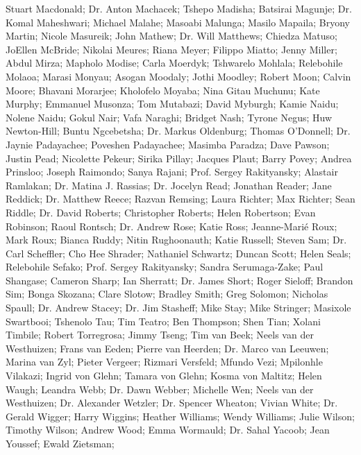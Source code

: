     Stuart Macdonald;
Dr. Anton Machacek;
    Tshepo Madisha;
    Batsirai Magunje;
Dr. Komal Maheshwari;
    Michael Malahe;
    Masoabi Malunga;
    Masilo Mapaila;
    Bryony Martin;
    Nicole Masureik;
    John Mathew;
Dr. Will Matthews;
    Chiedza Matuso;
    JoEllen McBride;
    Nikolai Meures;
    Riana Meyer;
    Filippo Miatto;
    Jenny Miller;
    Abdul Mirza;
    Mapholo Modise;
    Carla Moerdyk;
    Tshwarelo Mohlala;
    Relebohile Molaoa;
    Marasi Monyau;
    Asogan Moodaly;
    Jothi Moodley;
    Robert Moon;
    Calvin Moore;
    Bhavani Morarjee;
    Kholofelo Moyaba;
    Nina Gitau Muchunu;
    Kate Murphy;
    Emmanuel Musonza;
    Tom Mutabazi;
    David Myburgh;
    Kamie Naidu;
    Nolene Naidu;
    Gokul Nair;
    Vafa Naraghi;
    Bridget Nash;
    Tyrone Negus;
    Huw Newton-Hill;
    Buntu Ngcebetsha;
Dr. Markus Oldenburg;
    Thomas O’Donnell;
Dr. Jaynie Padayachee;
    Poveshen Padayachee;
    Masimba Paradza;
    Dave Pawson;
    Justin Pead;
    Nicolette Pekeur;
    Sirika Pillay;
    Jacques Plaut;
    Barry Povey;
    Andrea Prinsloo;
    Joseph Raimondo;
    Sanya Rajani;
Prof. Sergey Rakityansky;
    Alastair Ramlakan;
Dr. Matina J. Rassias;
Dr. Jocelyn Read;
    Jonathan Reader;
    Jane Reddick;
Dr. Matthew Reece;
    Razvan Remsing;
    Laura Richter;
    Max Richter;
    Sean Riddle;
Dr. David Roberts;
    Christopher Roberts;
    Helen Robertson;
    Evan Robinson;
    Raoul Rontsch;
Dr. Andrew Rose;
    Katie Ross;
    Jeanne-Marié Roux;
    Mark Roux;
    Bianca Ruddy;
    Nitin Rughoonauth;
    Katie Russell;
    Steven Sam;
Dr. Carl Scheffler;
    Cho Hee Shrader;
    Nathaniel Schwartz;
    Duncan Scott;
    Helen Seals;
    Relebohile Sefako;
    Prof. Sergey Rakityansky;
    Sandra Serumaga-Zake;
    Paul Shangase;
    Cameron Sharp;
    Ian Sherratt;
Dr. James Short;
    Roger Sieloff;
    Brandon Sim;
    Bonga Skozana;
    Clare Slotow;
    Bradley Smith;
    Greg Solomon;
    Nicholas Spaull;
Dr. Andrew Stacey;
Dr. Jim Stasheff;
    Mike Stay;
    Mike Stringer;
    Masixole Swartbooi;
    Tshenolo Tau;
    Tim Teatro;
    Ben Thompson;
    Shen Tian;
    Xolani Timbile;
    Robert Torregrosa;
    Jimmy Tseng;
    Tim van Beek;
    Neels van der Westhuizen;
    Frans van Eeden;
    Pierre van Heerden;
Dr. Marco van Leeuwen;
    Marina van Zyl;
    Pieter Vergeer;
    Rizmari Versfeld;
    Mfundo Vezi;
    Mpilonhle Vilakazi;
    Ingrid von Glehn;
    Tamara von Glehn;
    Kosma von Maltitz;
    Helen Waugh;
    Leandra Webb;
Dr. Dawn Webber;
    Michelle Wen;
    Neels van der Westhuizen;
Dr. Alexander Wetzler;
Dr. Spencer Wheaton;
    Vivian White;
Dr. Gerald Wigger;
    Harry Wiggins;
    Heather Williams;
    Wendy Williams;
    Julie Wilson;
    Timothy Wilson;
    Andrew Wood;
    Emma Wormauld;
Dr. Sahal Yacoob;
    Jean Youssef;
    Ewald Zietsman;




